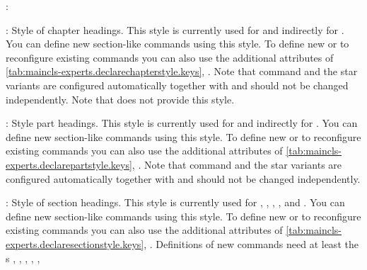 \begin{labeling}{:}
\item[\PValue{chapter}:] Style of chapter headings. This style is currently used
  for  and indirectly for
  . You can define new section-like commands
  using this style. To define new or to reconfigure existing commands you can
  also use the additional attributes of
  \autoref{tab:maincls-experts.declarechapterstyle.keys},
  .
  Note that command  and the star variants
  are configured automatically together with  and should not be
  changed independently. Note that  does not provide this style.
\item[\PValue{part}:] Style part headings. This style is
  currently used for  and indirectly for
  . You can define new section-like commands
  using this style. To define new or to reconfigure existing commands you can
  also use the additional attributes of
  \autoref{tab:maincls-experts.declarepartstyle.keys},
  .
  Note that command  and the star variants
  are configured automatically together with  and should not be
  changed independently.
\item[\PValue{section}:] Style of section headings. This style is currently
  used for ,
  ,
  ,
  , and
  . You can define new section-like
  commands using this style. To define new or to reconfigure existing commands
  you can also use the additional attributes of
  \autoref{tab:maincls-experts.declaresectionstyle.keys},
  . Definitions of
  new commands need at least the s ,
  , , , ,

\end{labeling}
